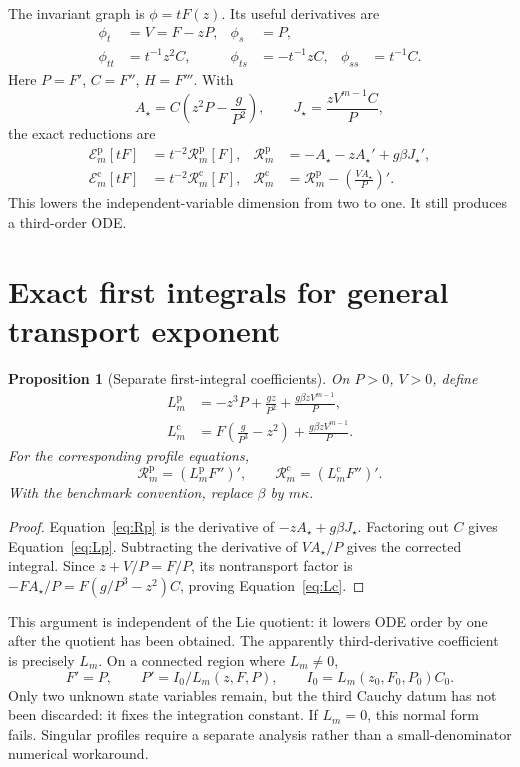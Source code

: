 \documentclass[12pt,a4paper,oneside]{report}
\numberwithin{equation}{chapter}
\newtheorem{proposition}[theorem]{Proposition}
\newcommand{\R}{\mathcal R}
\newcommand{\E}{\mathcal E}
\begin{document}
The invariant graph is $\phi=tF(z)$. Its useful derivatives are
\begin{align}
\phi_t&=V=F-zP,&\phi_s&=P,\\
\phi_{tt}&=t^{-1}z^2C,&\phi_{ts}&=-t^{-1}zC,&
\phi_{ss}&=t^{-1}C.
\end{align}
Here $P=F'$, $C=F''$, $H=F'''$. With
\begin{equation}
A_\star=C\left(z^2P-\frac g{P^2}\right),\qquad
J_\star=\frac{zV^{m-1}C}{P},
\end{equation}
the exact reductions are
\begin{align}
\E_m^{\mathrm p}[tF]&=t^{-2}\R_m^{\mathrm p}[F],&
\R_m^{\mathrm p}&=-A_\star-zA_\star'+g\beta J_\star',\label{eq:Rp}\\
\E_m^{\mathrm c}[tF]&=t^{-2}\R_m^{\mathrm c}[F],&
\R_m^{\mathrm c}&=\R_m^{\mathrm p}-\left(\frac{VA_\star}{P}\right)'.\label{eq:Rc}
\end{align}
This lowers the independent-variable dimension from two to one. It still
produces a third-order ODE.

\section{Exact first integrals for general transport exponent}
\begin{proposition}[Separate first-integral coefficients]\label{prop:integral}
On $P>0$, $V>0$, define
\begin{align}
L_m^{\mathrm p}&=-z^3P+\frac{gz}{P^2}
 +\frac{g\beta zV^{m-1}}P,\label{eq:Lp}\\
L_m^{\mathrm c}&=F\left(\frac g{P^3}-z^2\right)
 +\frac{g\beta zV^{m-1}}P.\label{eq:Lc}
\end{align}
For the corresponding profile equations,
\begin{equation}\label{eq:firstintegral}
\R_m^{\mathrm p}=\left(L_m^{\mathrm p}F''\right)',\qquad
\R_m^{\mathrm c}=\left(L_m^{\mathrm c}F''\right)'.
\end{equation}
With the benchmark convention, replace $\beta$ by $m\kappa$.
\end{proposition}
\begin{proof}
Equation~\eqref{eq:Rp} is the derivative of
$-zA_\star+g\beta J_\star$. Factoring out $C$ gives
Equation~\eqref{eq:Lp}. Subtracting the derivative of $VA_\star/P$ gives the
corrected integral. Since $z+V/P=F/P$, its nontransport factor is
$-FA_\star/P=F(g/P^3-z^2)C$, proving Equation~\eqref{eq:Lc}.
\end{proof}
This argument is independent of the Lie quotient: it lowers ODE order by
one after the quotient has been obtained. The apparently third-derivative
coefficient is precisely $L_m$. On a connected region where $L_m\ne0$,
\begin{equation}\label{eq:secondorder}
F'=P,\qquad P'=I_0/L_m(z,F,P),\qquad
I_0=L_m(z_0,F_0,P_0)C_0.
\end{equation}
Only two unknown state variables remain, but the third Cauchy datum has not
been discarded: it fixes the integration constant. If $L_m=0$, this normal
form fails. Singular profiles require a separate analysis rather than a
small-denominator numerical workaround.
\end{document}
